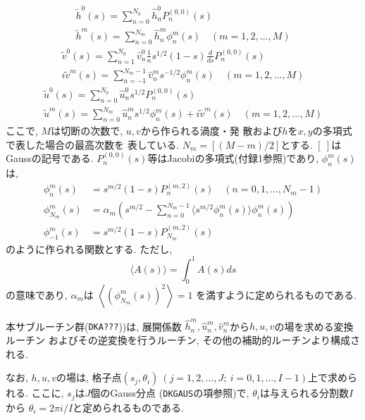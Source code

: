 \documentclass[a4j,fleqn]{jarticle}
\begin{document}
\begin{gather}
\tilde h^0(s) = \sum^{N_0}_{n=0}\hat h^0_n P^{(0,0)}_n(s) 
\label{th0expn}\\
\tilde h^m(s) = \sum^{N_m}_{n=0}\hat h^m_n\phi^m_n(s)
                \quad (m=1,2,\dots,M)
\label{thmexpn}
\end{gather}
\begin{gather}
\tilde v^0(s) = \sum^{N_0}_{n=1}\hat v^0_n 
                   \frac1n s^{1/2}(1-s)\frac{d}{ds}P^{(0,0)}_n(s)
\label{tv0expn}\\
i\tilde v^m(s) = \sum^{N_m-1}_{n=-1}
                  \hat v^m_n s^{-1/2}\phi^m_n(s) \quad (m=1,2,\dots,M)
\label{tvmexpn}
\end{gather}
\begin{gather}
\tilde u^0(s) = \sum^{N_0}_{n=0}\hat u^0_n 
                   s^{1/2}P^{(0,0)}_n(s) 
\label{tu0expn}\\
\tilde u^m(s) = \sum^{N_m}_{n=0}
                  \hat u^m_n s^{1/2}\phi^m_n(s)
		  +i\tilde v^m(s) 
		  \quad (m=1,2,\dots,M)
\label{tumexpn}
\end{gather}
ここで, $M$は切断の次数で, $u,v$から作られる渦度・発
散および$h$を$x,y$の多項式で表した場合の最高次数を
表している. $N_m=[(M-m)/2]$とする.
$[\ ]$はGaussの記号である.
$P^{(0,0)}_n(s)$等はJacobiの多項式(付録1参照)であり, 
$\phi^m_n(s)$は,
\[
\begin{split}
\phi^m_n(s) &= s^{m/2}(1-s)P^{(m,2)}_n(s) \quad (n=0,1,\dots, N_m-1)\\
\phi^m_{N_m}(s) &= \alpha_m
\left(s^{m/2}-\sum^{N_m-1}_{n=0}\langle s^{m/2}\phi^m_n(s)\rangle
\phi^m_n(s)
\right) \\
\phi^m_{-1}(s) &= s^{m/2}(1-s)P^{(m,2)}_{N_m}(s)
\end{split}
\]
のように作られる関数とする. ただし,
\[
\langle A(s)\rangle=\int^1_0 A(s)ds
\]
の意味であり, $\alpha_m$は
$
\left\langle\left(\phi^m_{N_m}(s)\right)^2\right\rangle=1
$
を満すように定められるものである.

本サブルーチン群({\tt DKA???}))は, 展開係数
$\hat h^m_n,\hat u^m_n, \hat v^m_n$から$h,u,v$の場を求める変換ルーチン
およびその逆変換を行うルーチン, その他の補助的ルーチンより構成される.

なお, $h,u,v$の場は, 格子点$(s_j,\theta_i)\ (j=1,2,\dots,J;\
i=0,1,\dots,I-1)$上で求められる. ここに, $s_j$は$J$個のGauss分点
({\tt DKGAUS}の項参照)で, $\theta_i$は与えられる分割数$I$から
$\theta_i=2\pi i/I$と定められるものである.

\end{document}
